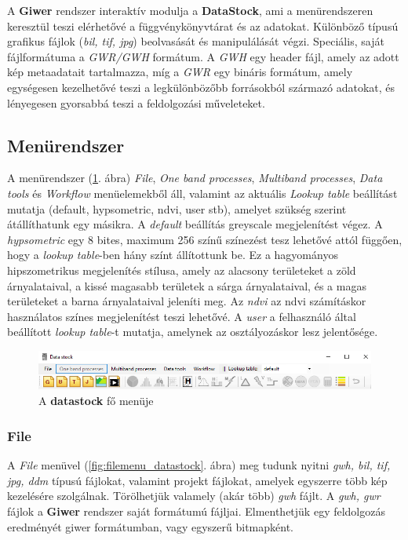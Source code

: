 \documentclass[a4paper,12pt]{article}
\begin{document}
A \textbf{Giwer} rendszer interaktív modulja a \textbf{DataStock}, ami a menürendszeren keresztül teszi elérhetővé a függvénykönyvtárat és az adatokat. Különböző típusú grafikus fájlok (\textit{bil, tif, jpg}) beolvasását és manipulálását végzi. Speciális, saját fájlformátuma a \textit{GWR/GWH} formátum. A \textit{GWH} egy header fájl, amely az adott kép metaadatait tartalmazza, míg a \textit{GWR} egy bináris formátum, amely egységesen kezelhetővé teszi a legkülönbözőbb forrásokból származó adatokat, és lényegesen gyorsabbá teszi a feldolgozási műveleteket.

\subsection{Menürendszer}

A menürendszer (\ref{fig:datastock_fomenu}. ábra) \textit{File}, \textit{One band processes}, \textit{Multiband processes}, \textit{Data tools} és \textit{Workflow} menüelemekből áll, valamint  az aktuális \textit{Lookup table} beállítást mutatja (default, hypsometric, ndvi, user stb), amelyet szükség szerint átállíthatunk egy másikra. A \textit{default} beállítás greyscale megjelenítést végez. A \textit{hypsometric} egy 8 bites, maximum 256 színű színezést tesz lehetővé attól függően, hogy a \textit{lookup table}-ben hány színt állítottunk be. Ez a hagyományos hipszometrikus megjelenítés stílusa, amely az alacsony területeket a zöld árnyalataival, a kissé magasabb területek a sárga árnyalataival, és a magas területeket a barna árnyalataival jeleníti meg. Az \textit{ndvi} az ndvi számításkor használatos színes megjelenítést teszi lehetővé. A \textit{user} a felhasználó által beállított \textit{lookup table}-t mutatja, amelynek az osztályozáskor lesz jelentősége.

\begin{figure}
	\centering
	\includegraphics[width=14cm]{datastock_fomenu.png}
	\caption{A \textbf{datastock} fő menüje}
	\label{fig:datastock_fomenu}
\end{figure}

\subsubsection{File}

A \textit{File} menüvel (\ref{fig:filemenu_datastock}. ábra) meg tudunk nyitni \textit{gwh, bil, tif, jpg, ddm} típusú fájlokat, valamint projekt fájlokat, amelyek egyszerre több kép kezelésére szolgálnak. Törölhetjük valamely (akár több) \textit{gwh} fájlt. A \textit{gwh, gwr} fájlok a \textbf{Giwer} rendszer saját formátumú fájljai. Elmenthetjük egy feldolgozás eredményét giwer formátumban, vagy egyszerű bitmapként. 
\end{document}
